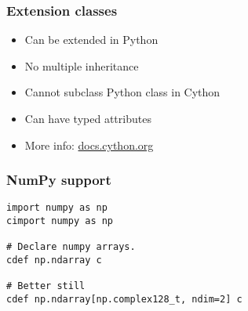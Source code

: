 \documentclass[14pt,compress]{beamer}
\begin{document}
\begin{frame}
    \frametitle{Extension classes}
    \begin{itemize}
        \item Can be extended in Python
        \item No multiple inheritance
        \item Cannot subclass Python class in Cython
        \item Can have typed attributes
        \item More info: \url{docs.cython.org}
    \end{itemize}
\end{frame}

\begin{frame}[fragile]
    \frametitle{NumPy support}
\begin{lstlisting}
import numpy as np
cimport numpy as np

# Declare numpy arrays.
cdef np.ndarray c

# Better still
cdef np.ndarray[np.complex128_t, ndim=2] c

\end{lstlisting}

\end{frame}
\end{document}
